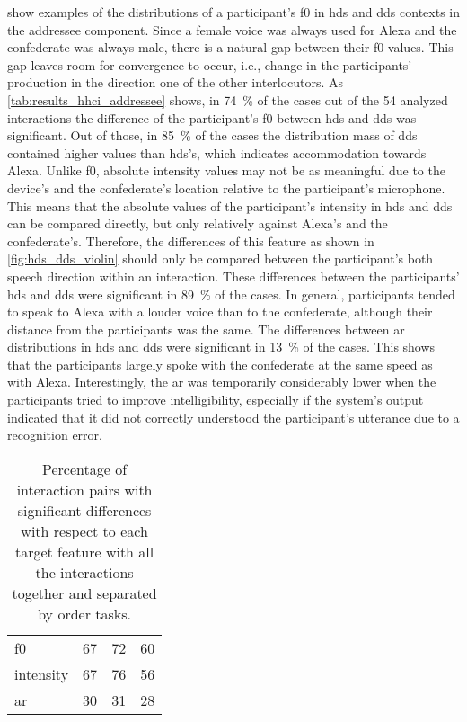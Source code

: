  show examples of the distributions of a participant's \ac{f0} in \ac{hds} and \ac{dds} contexts in the addressee component.
Since a female voice was always used for Alexa and the confederate was always male, there is a natural gap between their \ac{f0} values.
This gap leaves room for convergence to occur, i.e., change in the participants' production in the direction one of the other interlocutors.
As \cref{tab:results_hhci_addressee} shows, in \SI{74}{\percent} of the cases out of the 54 analyzed interactions the difference of the participant's \ac{f0} between \ac{hds} and \ac{dds} was significant.
Out of those, in \SI{85}{\percent} of the cases the distribution mass of \ac{dds} contained higher values than \ac{hds}'s, which indicates accommodation towards Alexa.
Unlike \ac{f0}, absolute intensity values may not be as meaningful due to the device's and the confederate's location relative to the participant's microphone.
This means that the absolute values of the participant's intensity in \ac{hds} and \ac{dds} can be compared directly, but only relatively against Alexa's and the confederate's.
Therefore, the differences of this feature as shown in \cref{fig:hds_dds_violin} should only be compared between the participant's both speech direction within an interaction.
These differences between the participants' \ac{hds} and \ac{dds} were significant in \SI{89}{\percent} of the cases.
In general, participants tended to speak to Alexa with a louder voice than to the confederate, although their distance from the participants was the same.
The differences between \ac{ar} distributions in \ac{hds} and \ac{dds} were significant in \SI{13}{\percent} of the cases.
This shows that the participants largely spoke with the confederate at the same speed as with Alexa.
Interestingly, the \ac{ar} was temporarily considerably lower when the participants tried to improve intelligibility, especially if the system's output indicated that it did not correctly understood the participant's utterance due to a recognition error.
%
\begin{table}
	\centering
	\caption[Percentage of significantly different interaction pairs in addressee component]
		{Percentage of interaction pairs with significant differences with respect to each target feature with all the interactions together and separated by order tasks.}
	\label{tab:signif_conditions}
	\begin{tabularx}{\linewidth}{XSSS}
		\toprule
		 & {} & {}	& {}\\
		\midrule
		\acs{f0}	& 67	& 72	& 60 \\
		intensity 	& 67	& 76	& 56 \\
		\acs{ar}	& 30	& 31	& 28 \\
		\bottomrule	
	\end{tabularx}
\end{table}
